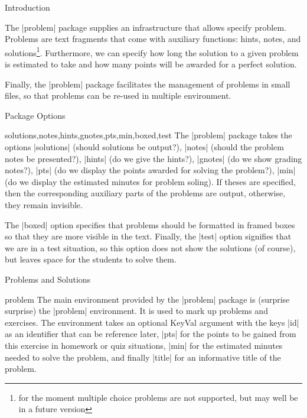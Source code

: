 \begin{sfragment}[id=sec:intro]{Introduction}

The |problem| package supplies an infrastructure that allows specify problem.  Problems
are text fragments that come with auxiliary functions: hints, notes, and
solutions\footnote{for the moment multiple choice problems are not supported, but may
  well be in a future version}. Furthermore, we can specify how long the solution to a
given problem is estimated to take and how many points will be awarded for a perfect
solution.

Finally, the |problem| package facilitates the management of problems in small files,
so that problems can be re-used in multiple environment. 

\begin{sfragment}{Package Options}
  \begin{function}{solutions,notes,hints,gnotes,pts,min,boxed,test}
    The |problem| package takes the options |solutions| (should solutions be output?),
    |notes| (should the problem notes be presented?), |hints| (do we give the hints?),
    |gnotes| (do we show grading notes?), |pts| (do we display the points awarded for
    solving the problem?), |min| (do we display the estimated minutes for problem
    soling). If theses are specified, then the corresponding auxiliary parts of the
    problems are output, otherwise, they remain invisible.

    The |boxed| option specifies that problems should be formatted in framed boxes so that
    they are more visible in the text. Finally, the |test| option signifies that we are in
    a test situation, so this option does not show the solutions (of course), but leaves
    space for the students to solve them.
  \end{function}
\end{sfragment}

\begin{sfragment}[id=sec:user:probsols]{Problems and Solutions}


\begin{environment}{problem}
  The main environment provided by the |problem| package is (surprise surprise) the
  |problem| environment. It is used to mark up problems and exercises. The environment
  takes an optional KeyVal argument with the keys |id| as an identifier that can be
  reference later, |pts| for the points to be gained from this exercise in homework or
  quiz situations, |min| for the estimated minutes needed to solve the problem, and
  finally |title| for an informative title of the problem.
\end{environment}


\end{sfragment}
\end{sfragment}
